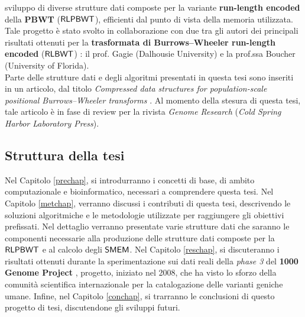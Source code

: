 \documentclass[a4paper,12pt, oneside]{book}
\def\RLBWT{\mbox{\rm {\sf RLBWT}}}
\def\RLPBWT{\mbox{\rm {\sf RLPBWT}}}
\def\SMEM{\mbox{\rm {\sf SMEM}}}
\begin{document}
sviluppo di 
diverse strutture dati composte per la variante 
\textbf{run-length encoded} della \textbf{PBWT} ($\RLPBWT$),
efficienti dal punto di vista della memoria utilizzata.
Tale progetto è stato svolto in
collaborazione con due tra gli autori dei principali risultati ottenuti per la
\textbf{trasformata di Burrows--Wheeler run-length encoded} ($\RLBWT$)
\cite{rlbwt} 
\cite{gagie2020} \cite{moni} \cite{phoni}: il 
prof. Gagie (Dalhousie University) e la prof.ssa Boucher 
(University of Florida).\\
Parte delle strutture dati e degli algoritmi presentati in questa tesi sono
inseriti in un articolo, dal titolo \textit{Compressed data structures for
  population-scale positional Burrows--Wheeler transforms} \cite{rlpbwt}.
Al
momento della 
stesura di questa tesi, tale articolo è in fase di review per la rivista
\textit{Genome Research} (\textit{Cold Spring Harbor Laboratory Press}).
\subsection*{Struttura della tesi}
Nel Capitolo \ref{prechap}, si introdurranno i concetti di base, di ambito
computazionale e bioinformatico, necessari a
comprendere questa tesi. Nel Capitolo \ref{metchap}, verranno discussi i
contributi di questa tesi, descrivendo le soluzioni algoritmiche e le
metodologie utilizzate per raggiungere gli obiettivi prefissati. Nel dettaglio
verranno presentate varie strutture dati che saranno le componenti necessarie
alla produzione delle strutture dati composte per la $\RLPBWT$ e al calcolo
degli $\SMEM$. Nel Capitolo 
\ref{reschap}, si discuteranno i risultati ottenuti durante la
sperimentazione sui dati reali della \textit{phase 3} del \textbf{1000 Genome
  Project} \cite{1kgp}, progetto, iniziato nel 2008, che ha
visto lo sforzo 
della comunità scientifica internazionale per la catalogazione delle varianti
geniche umane. Infine, nel Capitolo \ref{conchap}, si trarranno le conclusioni 
di questo progetto di tesi, discutendone gli sviluppi futuri.
\end{document}
